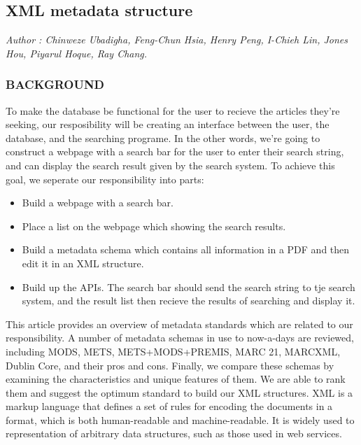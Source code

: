 \subsection{XML metadata structure}

\textit{\footnotesize Author : Chinweze Ubadigha, Feng-Chun Hsia, Henry Peng, I-Chieh Lin, Jones Hou, Piyarul Hoque, Ray Chang.}\\
\subsubsection*{BACKGROUND}
To make the database be functional for the user to recieve the articles they're seeking, our resposibility will be creating an interface between the user, the database, and the searching programe. In the other words, we're going to construct a webpage with a search bar for the user to enter their search string, and can display the search result given by the search system.
To achieve this goal, we seperate our responsibility into parts:\\
\begin{itemize}
	\item Build a webpage with a search bar.
	\item Place a list on the webpage which showing the search results.
	\item Build a metadata schema which contains all information in a PDF and then edit it in an XML structure. 
	\item Build up the APIs. The search bar should send the search string to tje search system, and the result list then recieve the results of searching and display it.
\end{itemize}
This article provides an overview of metadata standards which are related to our responsibility. 
A number of metadata schemas in use to now-a-days are reviewed, including MODS, METS, METS+MODS+PREMIS, MARC 21, MARCXML, Dublin Core, and  their pros and cons. 
Finally, we compare these schemas by examining the characteristics and unique features of them. 
We are able to rank them and suggest the optimum standard to build our XML structures. 
XML is a markup language that defines a set of rules for encoding the documents in a format,  which is both human-readable and machine-readable. 
It is widely used to representation of arbitrary data structures, such as those used in web services.

